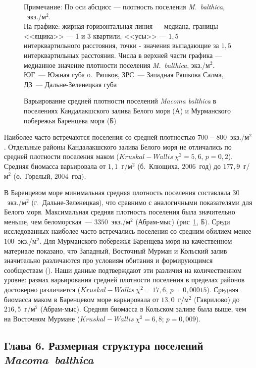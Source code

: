 {\begin{figure}[ht]
\begin{minipage}[]{.48\linewidth}
\begin{center}
	\end{center}
	\end{minipage}
	\hfill
	\caption{Варьирование средней плотности поселений {\it Macoma balthica} в поселениях Кандалакшского залива Белого моря (А) и Мурманского побережья Баренцева моря (Б)}
	{\footnotesize Примечание: По оси абсцисс --- плотность поселения {\it M.~balthica}, ~экз./м$^2$.\\
	На графике: жирная горизонтальная линия --- медиана, границы <<ящика>> --- 1 и 3 квартили, <<усы>> --- $1,5$ интерквартильного расстояния, точки - значения выпадающие за $1,5$ интерквартильных расстояния.
Числа в верхней части графика --- медианное значение плотности поселения {\it M.~balthica}, экз./м$^2$.\\
 ЮГ~--- Южная губа о.~Ряшков, ЗРС~--- Западная Ряшкова Салма, ДЗ~--- Дальне-Зеленецкая губа}
	\label{ris:N_area}
	\end{figure}

Наиболее часто встречаются поселения со средней плотностью $700-800$~экз./м$^2$.
Отдельные районы Кандалакшского залива Белого моря не отличались по средней плотности поселения маком ($Kruskal-Wallis\ \chi^2 = 5,6$, $p = 0,2$).
Средняя биомасса варьировала от $1,1$~г/м$^2$ (б.~Клющиха, $2006$~год) до $177,9$~г/м$^2$ (о.~Горелый, $2004$~год).

В Баренцевом море минимальная средняя плотность поселения составляла $30$~экз./м$^2$ (г.~Дальне-Зеленецкая), что сравнимо с аналогичными показателями для Белого моря. 
Максимальная средняя плотность поселения была значительно меньше, чем беломорская~--- $3350$~экз./м$^2$ (Абрам-мыс) (рис~\ref{ris:N_area}, Б).
Среди исследованных наиболее часто встречались поселения со средним обилием менее $100$~экз./м$^2$.
Для Мурманского побережья Баренцева моря на качественном материале показано, что Западный, Восточный Мурман и Кольский залив значительно различаются про условиям обитания и формирующимся сообществам (\cite{Guryanova_Ushakov_1929, Guryanova_et_al_1930}). 
Наши данные подтверждают эти различия на количественном уровне: размах варьирования средней плотности поселения в пределах районов достоверно различается ($Kruskal-Wallis\ \chi^2 = 17,6$, $p = 0,00015$).
Средняя биомасса маком в Баренцевом море варьировала от $13,0$~г/м$^2$ (Гаврилово) до $216,5$~г/м$^2$ (Абрам-мыс). 
Средняя биомасса в Кольском заливе была выше, чем на Восточном Мурмане ($Kruskal-Wallis~\chi^2 = 6,8$; $p = 0,009$).



\subsection*{Глава 6. Размерная структура поселений \textit{Macoma~balthica}}

}
